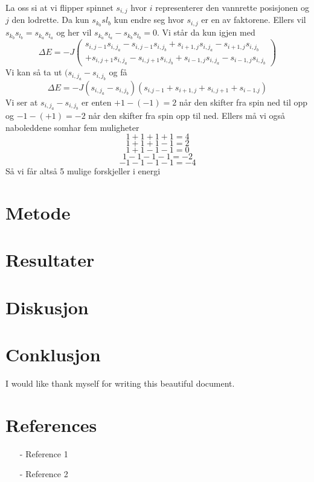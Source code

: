 \documentclass[reprint,english,notitlepage]{revtex4-1}  %
\begin{document}
La oss si at vi flipper spinnet $s_{i,j}$ hvor $i$ representerer den vannrette posisjonen og $j$ den lodrette. Da kun $s_{k_b}s{l_b}$ kun endre seg hvor $s_{i,j}$ er en av faktorene. Ellers vil $s_{k_b}s_{l_b}=s_{k_a}s_{l_a}$ og her vil $s_{k_a}s_{l_a}-s_{k_b}s_{l_b}=0$. Vi står da kun igjen med
$$
\Delta E= -J \begin{pmatrix} s_{i,j-1}s_{i,j_a}-s_{i,j-1}s_{i,j_b}+s_{i+1,j}s_{i,j_a}-s_{i+1,j}s_{i,j_b} \\+ s_{i,j+1}s_{i,j_a}-s_{i,j+1}s_{i,j_b}+s_{i-1,j}s_{i,j_a}-s_{i-1,j}s_{i,j_b}\end{pmatrix}
$$
Vi kan så ta ut $(s_{i,j_a}-s_{i,j_b}$ og få
$$
\Delta E=-J(s_{i,j_a}-s_{i,j_b})(
s_{i.j-1}+s_{i+1,j} +s_{i,j+1}+s_{i-1.j}
)
$$
Vi ser at $s_{i,j_a}-s_{i,j_b}$ er enten $+1-(-1)=2$ når den skifter fra spin ned til opp og $-1-(+1)=-2$ når den skifter fra spin opp til ned. Ellers må vi også naboleddene somhar fem muligheter
$$
1+1+1+1=4
$$
$$
1+1+1-1=2
$$
$$
1+1-1-1=0
$$
$$
1-1-1-1=-2
$$
$$
-1-1-1-1=-4
$$
Så vi får altså 5 mulige forskjeller i energi

\section{Metode}
\section{Resultater}
\section{Diskusjon}
\section{Conklusjon}
\begin{acknowledgments}  %
I would like thank myself for writing this beautiful document.
\end{acknowledgments}


\section*{References}  %
\begin{itemize}
\item[-]Reference 1
\item[-]Reference 2
\end{itemize}
\end{document}
